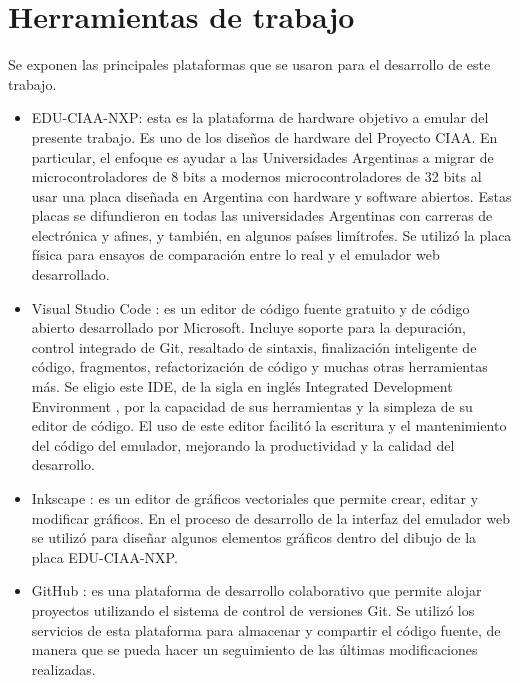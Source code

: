 \section{Herramientas de trabajo}
\label{sec:Herramientas de trabajo}

Se exponen las principales plataformas que se usaron para el desarrollo de este trabajo.

\begin{itemize}
	\item EDU-CIAA-NXP: esta es la plataforma de hardware objetivo a emular del presente trabajo. Es uno de los diseños de hardware del Proyecto CIAA. En particular, el enfoque es ayudar a las Universidades Argentinas a migrar de microcontroladores de 8 bits a modernos microcontroladores de 32 bits al usar una placa diseñada en Argentina con hardware y software abiertos. Estas placas se difundieron en todas las universidades Argentinas con carreras de electrónica y afines, y también, en algunos países limítrofes. 
Se utilizó la placa física para ensayos de comparación entre lo real y el emulador web desarrollado.

	\item Visual Studio Code \citep{VisualStudioCode}: es un editor de código fuente gratuito y de código abierto desarrollado por Microsoft. Incluye soporte para la depuración, control integrado de Git, resaltado de sintaxis, finalización inteligente de código, fragmentos, refactorización de código y muchas otras herramientas más. Se eligio este IDE, de la sigla en inglés Integrated Development Environment \citep{IDE}, por la capacidad de sus herramientas y la simpleza de su editor de código. El uso de este editor facilitó la escritura y el mantenimiento del código del emulador, mejorando la productividad y la calidad del desarrollo.
	
	\item Inkscape \citep{inkscape}: es un editor de gráficos vectoriales que permite crear, editar y modificar gráficos. En el proceso de desarrollo de la interfaz del emulador web se utilizó para diseñar algunos elementos gráficos dentro del dibujo de la placa EDU-CIAA-NXP.

	\item GitHub \citep{GitHub}: es una plataforma de desarrollo colaborativo que permite alojar proyectos utilizando el sistema de control de versiones Git. Se utilizó los servicios de esta plataforma para almacenar y
compartir el código fuente, de manera que se pueda hacer un seguimiento
de las últimas modificaciones realizadas.
	

\end{itemize}
